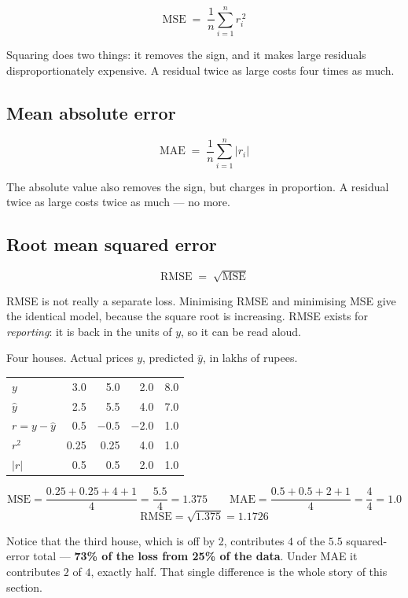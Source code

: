 \documentclass[11pt]{article}
\begin{document}
\[
  \mathrm{MSE} \;=\; \frac{1}{n}\sum_{i=1}^{n} r_i^{\,2}
\]

Squaring does two things: it removes the sign, and it makes large residuals
disproportionately expensive. A residual twice as large costs four times as
much.

\subsection{Mean absolute error}

\[
  \mathrm{MAE} \;=\; \frac{1}{n}\sum_{i=1}^{n} \lvert r_i \rvert
\]

The absolute value also removes the sign, but charges in proportion. A residual
twice as large costs twice as much --- no more.

\subsection{Root mean squared error}

\[
  \mathrm{RMSE} \;=\; \sqrt{\mathrm{MSE}}
\]

RMSE is not really a separate loss. Minimising RMSE and minimising MSE give the
identical model, because the square root is increasing. RMSE exists for
\emph{reporting}: it is back in the units of $y$, so it can be read aloud.

\begin{worked}
Four houses. Actual prices $y$, predicted $\hat{y}$, in lakhs of rupees.

\begin{center}
\begin{tabular}{@{}lrrrr@{}}
\toprule
$y$        & 3.0 & 5.0 & 2.0 & 8.0\\
$\hat{y}$  & 2.5 & 5.5 & 4.0 & 7.0\\
\midrule
$r = y-\hat{y}$ & 0.5 & $-0.5$ & $-2.0$ & 1.0\\
$r^2$           & 0.25 & 0.25 & 4.0 & 1.0\\
$\lvert r\rvert$& 0.5 & 0.5 & 2.0 & 1.0\\
\bottomrule
\end{tabular}
\end{center}

\[
  \mathrm{MSE}=\frac{0.25+0.25+4+1}{4}=\frac{5.5}{4}=\mathbf{1.375}
  \qquad
  \mathrm{MAE}=\frac{0.5+0.5+2+1}{4}=\frac{4}{4}=\mathbf{1.0}
\]
\[
  \mathrm{RMSE}=\sqrt{1.375}=\mathbf{1.1726}
\]

Notice that the third house, which is off by 2, contributes $4$ of the $5.5$
squared-error total --- \textbf{73\% of the loss from 25\% of the data}. Under
MAE it contributes $2$ of $4$, exactly half. That single difference is the
whole story of this section.
\end{worked}
\end{document}
